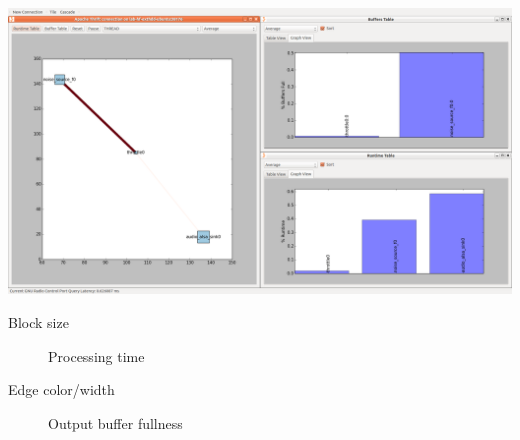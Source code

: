 \documentclass[10pt]{article}
\begin{document}
\begin{multicols*}{3}
\includegraphics[width=0.99\linewidth]{gr-perf-monitorx-screenshot.png}

\begin{description}
\item[Block size] Processing time
\item[Edge color/width] Output buffer fullness
\end{description}


%
%
%
%
%

\end{multicols*}
\end{document}
